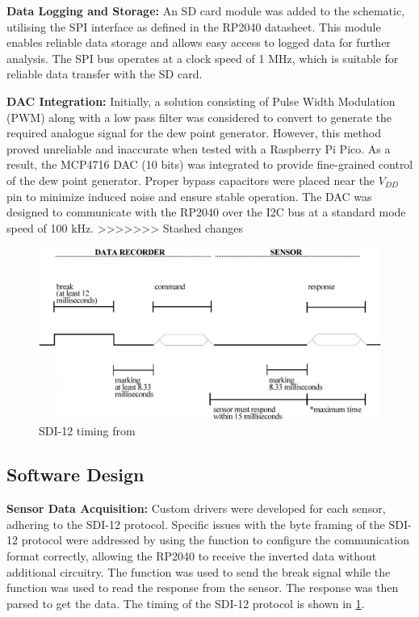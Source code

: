 \textbf{Data Logging and Storage:} An SD card module was added to the schematic, utilising the 
SPI interface as defined in the RP2040 datasheet. This module enables reliable data storage 
and allows easy access to logged data for further analysis. The SPI bus operates at a clock 
speed of 1 MHz, which is suitable for reliable data transfer with the SD card.

\textbf{DAC Integration:} Initially, a solution consisting of Pulse Width Modulation (PWM) 
along with a low pass filter was considered to convert to generate the required analogue signal 
for the dew point generator. However, this method proved unreliable and inaccurate when tested 
with a Raspberry Pi Pico. As a result, the MCP4716 DAC (10 bits) was integrated to provide fine-grained control of 
the dew point generator. Proper bypass capacitors were placed near the $V_{DD}$ pin 
to minimize induced noise and ensure stable operation. The DAC was designed to communicate with the RP2040 
over the I2C bus at a standard mode speed of 100 kHz.
>>>>>>> Stashed changes

\begin{figure}
    \includegraphics[width=\linewidth]{figures/SDI-12_timing.png}
    \caption{SDI-12 timing from \cite{sdi12_datasheet}}
    \label{sdi12_timing}
\end{figure}

\subsection{Software Design}
\textbf{Sensor Data Acquisition:} Custom drivers were developed for each sensor, adhering to the SDI-12 
protocol. Specific issues with the byte framing of the SDI-12 protocol were addressed by using the 
 function to configure the communication format correctly, allowing the RP2040 
to receive the inverted data without additional circuitry. The  function was used to 
send the break signal while the  function was used to read the response from 
the sensor. The response was then parsed to get the data. The timing of the SDI-12 protocol is shown 
in \cref{sdi12_timing}.

